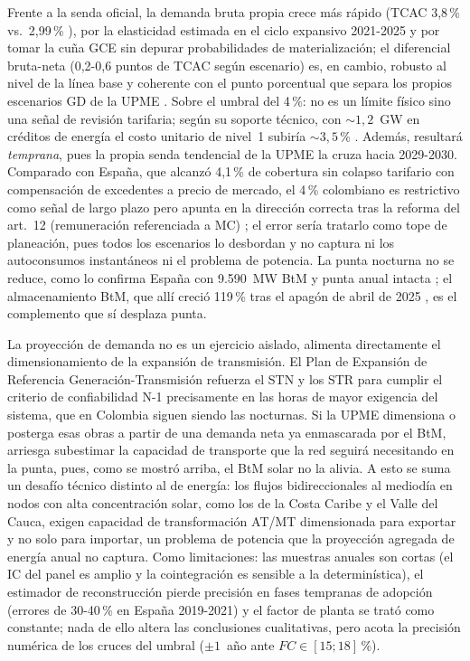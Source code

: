 \documentclass[11pt,letterpaper]{article}
\begin{document}
Frente a la senda oficial, la demanda bruta propia crece más rápido (TCAC
3,8\,\% vs.\ 2,99\,\% \cite{upme2026}), por la elasticidad estimada en el
ciclo expansivo 2021-2025 y por tomar la cuña GCE sin depurar
probabilidades de materialización; el diferencial bruta-neta (0,2-0,6
puntos de TCAC según escenario) es, en cambio, robusto al nivel de la línea
base y coherente con el punto porcentual que separa los propios escenarios
GD de la UPME \cite{upme2026}. Sobre el umbral del 4\,\%: no es un límite
físico sino una señal de revisión tarifaria; según su soporte técnico, con
${\sim}1{,}2$~GW en créditos de energía el costo unitario de nivel~1 subiría
${\sim}3{,}5$\,\% \cite{creg901099}. Además, resultará \emph{temprana}, pues
la propia senda tendencial de la UPME la cruza hacia 2029-2030. Comparado
con España, que alcanzó 4,1\,\% de cobertura sin colapso tarifario con
compensación de excedentes a precio de mercado, el 4\,\% colombiano es restrictivo como señal de largo
plazo pero apunta en la dirección correcta tras la reforma del art.~12
(remuneración referenciada a MC) \cite{creg101072}; el error sería tratarlo
como tope de planeación, pues todos los escenarios lo desbordan y no captura
ni los autoconsumos instantáneos ni el problema de potencia. La punta
nocturna no se reduce, como lo confirma España con 9.590~MW BtM y punta
anual intacta \cite{ree2026}; el almacenamiento BtM, que allí creció 119\,\%
tras el apagón de abril de 2025 \cite{appa2025}, es el complemento que sí
desplaza punta.

La proyección de demanda no es un ejercicio aislado, alimenta directamente
el dimensionamiento de la expansión de transmisión. El Plan de Expansión de
Referencia Generación-Transmisión \cite{plangt2016} refuerza el STN y los
STR para cumplir el criterio de confiabilidad N-1 precisamente en las horas
de mayor exigencia del sistema, que en Colombia siguen siendo las nocturnas.
Si la UPME dimensiona o posterga esas obras a partir de una demanda neta ya
enmascarada por el BtM, arriesga subestimar la capacidad de transporte que
la red seguirá necesitando en la punta, pues, como se mostró arriba, el BtM
solar no la alivia. A esto se suma un desafío técnico distinto al de
energía: los flujos bidireccionales al mediodía en nodos con alta
concentración solar, como los de la Costa Caribe y el Valle del Cauca,
exigen capacidad de transformación AT/MT dimensionada para exportar y no
solo para importar, un problema de potencia que la proyección agregada de
energía anual no captura. Como limitaciones: las muestras anuales son cortas (el IC
del panel es amplio y la cointegración es sensible a la determinística), el
estimador de reconstrucción pierde precisión en fases tempranas de adopción
(errores de 30-40\,\% en España 2019-2021) y el factor de planta se trató
como constante; nada de ello altera las conclusiones cualitativas, pero
acota la precisión numérica de los cruces del umbral ($\pm1$~año ante
$FC\in[15;18]$\,\%).
\end{document}
